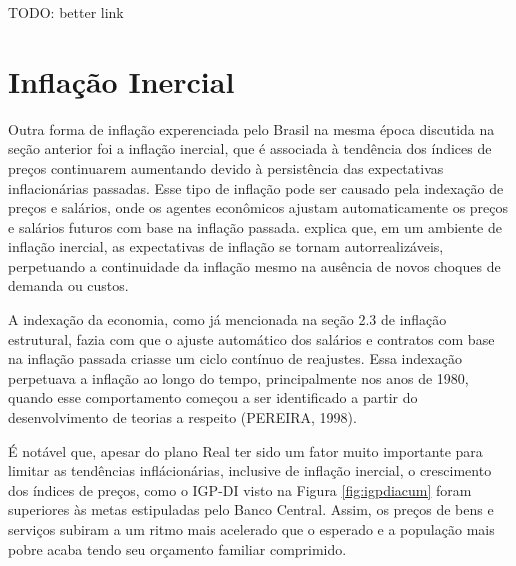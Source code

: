 \documentclass[12pt,oneside,a4paper,chapter=TITLE,english,brazil,sumario=abnt-6027-2012]{abntex2}
\begin{document}
TODO: better link

\section{Inflação Inercial}


Outra forma de inflação experenciada pelo Brasil na mesma época discutida na seção anterior foi a inflação inercial, que é associada à tendência dos índices de preços continuarem aumentando devido à persistência das expectativas inflacionárias passadas. Esse tipo de inflação pode ser causado pela indexação de preços e salários, onde os agentes econômicos ajustam automaticamente os preços e salários futuros com base na inflação passada.  explica que, em um ambiente de inflação inercial, as expectativas de inflação se tornam autorrealizáveis, perpetuando a continuidade da inflação mesmo na ausência de novos choques de demanda ou custos.

A indexação da economia, como já mencionada na seção 2.3 de inflação estrutural, fazia com que o ajuste automático dos salários e contratos com base na inflação passada criasse um ciclo contínuo de reajustes. Essa indexação perpetuava a inflação ao longo do tempo, principalmente nos anos de 1980, quando esse comportamento começou a ser identificado a partir do desenvolvimento de teorias a respeito (PEREIRA, 1998).

É notável que, apesar do plano Real ter sido um fator muito importante para limitar as tendências inflácionárias, inclusive de inflação	inercial, o crescimento dos índices de preços, como o IGP-DI visto na Figura \ref{fig:igpdiacum} foram superiores às metas estipuladas pelo Banco Central. Assim, os preços de bens e serviços subiram a um ritmo mais acelerado que o esperado e a população mais pobre acaba tendo seu orçamento familiar comprimido.
\end{document}
